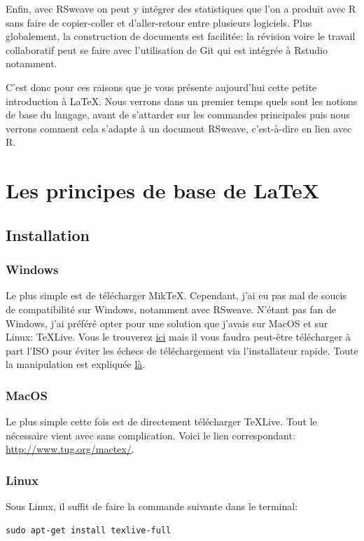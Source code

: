 \documentclass[a4paper, 11pt]{article}\usepackage[]{graphicx}\usepackage[]{xcolor}
\begin{document}
Enfin, avec RSweave on peut y intégrer des statistiques que l'on a produit avec R sans faire de copier-coller et d'aller-retour entre plusieurs logiciels. Plus globalement, la construction de documents est facilitée: la révision voire le travail collaboratif peut se faire avec l'utilisation de Git qui est intégrée à Rstudio notamment.

C'est donc pour ces raisons que je vous présente aujourd'hui cette petite introduction à \LaTeX. Nous verrons dans un premier temps quels sont les notions de base du langage, avant de s'attarder sur les commandes principales puis nous verrons comment cela s'adapte à un document RSweave, c'est-à-dire en lien avec R.

\section{Les principes de base de \LaTeX}
\subsection{Installation}
\subsubsection{Windows}
Le plus simple est de télécharger Mik\TeX. Cependant, j'ai eu pas mal de soucis de compatibilité sur Windows, notamment avec RSweave. N'étant pas fan de Windows, j'ai préféré opter pour une solution que j'avais sur MacOS et sur Linux: \TeX Live. Vous le trouverez \href{https://tug.org/texlive/quickinstall.html}{ici} mais il vous faudra peut-être télécharger à part l'ISO pour éviter les échecs de téléchargement via l'installateur rapide. Toute la manipulation est expliquée \href{https://tug.org/texlive/doc/texlive-en/texlive-en.html#installation}{là}.

\subsubsection{MacOS}
Le plus simple cette fois est de directement télécharger \TeX Live. Tout le nécessaire vient avec sans complication. Voici le lien correspondant: \href{http://www.tug.org/mactex/}{http://www.tug.org/mactex/}.

\subsubsection{Linux}
Sous Linux, il suffit de faire la commande suivante dans le terminal:
\begin{verbatim}
sudo apt-get install texlive-full
\end{verbatim}
\end{document}
